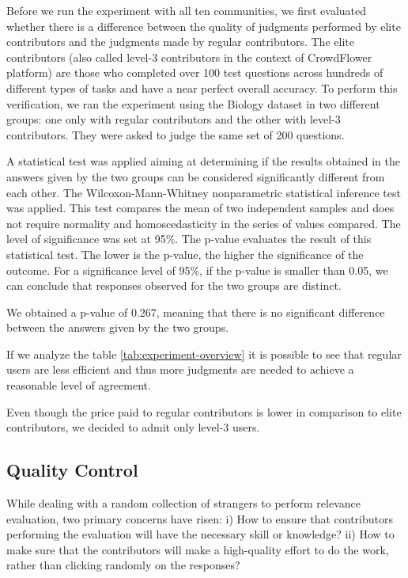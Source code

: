 Before we run the experiment with all ten communities, we first evaluated whether there is a difference between the quality of judgments performed by elite contributors and the judgments made by regular contributors. The elite contributors (also called level-3 contributors in the context of CrowdFlower platform) are those who completed over 100 test questions across hundreds of different types of tasks and have a near perfect overall accuracy. To perform this verification, we ran the experiment using the Biology dataset in two different groups: one only with regular contributors and the other with level-3 contributors. They were asked to judge the same set of 200 questions. 

A statistical test was applied aiming at determining if the results obtained in the answers given by the two groups can be considered significantly different from each other. The Wilcoxon-Mann-Whitney nonparametric statistical inference test was applied\cite{feltovich2003nonparametric}. This test compares the mean of two independent samples and does not require normality and homoscedasticity in the series of values compared. The level of significance was set at 95\%. The p-value evaluates the result of this statistical test. The lower is the p-value, the higher the significance of the outcome. For a significance level of 95\%, if the p-value is smaller than 0.05, we can conclude that responses observed for the two groups are distinct. 

We obtained a p-value of  0.267, meaning that there is no significant difference between the answers given by the two groups. 

If we analyze the table \ref{tab:experiment-overview} it is possible to see that regular users are less efficient and thus more judgments are needed to achieve a reasonable level of agreement. 

Even though the price paid to regular contributors is lower in comparison to elite contributors, we decided to admit only level-3 users.

\subsection{\hspace*{3pt} Quality Control}

While dealing with a random collection of strangers to perform relevance evaluation, two primary concerns have risen:  i) How to ensure that contributors performing the evaluation will have the necessary skill or knowledge? ii) How to make sure that the contributors will make a high-quality effort to do the work, rather than clicking randomly on the responses?

